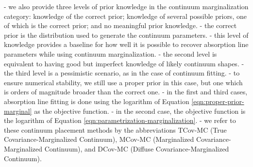 \documentclass[trackchanges]{aastex62}
\begin{document}
{- we also provide three levels of prior knowledge in the continuum marginalization category: knowledge of the correct prior; knowledge of several possible priors, one of which is the correct prior; and no meaningful prior knowledge.
- the correct prior is the distribution used to generate the continuum parameters.
- this level of knowledge provides a baseline for how well it is possible to recover absorption line parameters while using continuum marginalization.
- the second level is equivalent to having good but imperfect knowledge of likely continuum shapes.
- the third level is a pessimistic scenario, as in the case of continuum fitting.
- to ensure numerical stability, we still use a proper prior in this case, but one which is orders of magnitude broader than the correct one.
- in the first and third cases, absorption line fitting is done using the logarithm of Equation \ref{eqn:proper-prior-marginal} as the objective function.
- in the second case, the objective function is the logarithm of Equation \ref{eqn:parametrization-marginalization}.
- we refer to these continuum placement methods by the abbreviations TCov-MC (True Covariance-Marginalized Continuum), MCov-MC (Marginalized Covariance-Marginalized Continuum), and DCov-MC (Diffuse Covariance-Marginalized Continuum).



}
\end{document}
